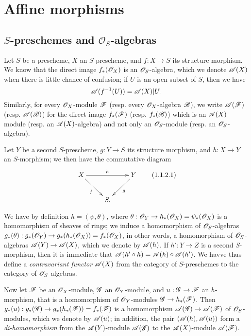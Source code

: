 \section{Affine morphisms}
\label{section:2.1}

\subsection{$S$-preschemes and $\mathcal{O}_S$-algebras}
\label{subsection:2.1.1}

\begin{env}[1.1.1]
\label{2.1.1.1}
Let $S$ be a prescheme, $X$ an $S$-prescheme, and $f:X\to S$ its structure morphism.
We know  that the direct image $f_*(\mathscr{O}_X)$ is an $\mathscr{O}_S$-algebra, which we
denote $\mathscr{A}(X)$ when there is little chance of confusion; if $U$ is an open subset of $S$, then we have
\[
  \mathscr{A}(f^{-1}(U))=\mathscr{A}(X)|U.
\]
Similarly, for every $\mathscr{O}_X$-module $\mathscr{F}$ (resp. every $\mathscr{O}_X$-algebra $\mathscr{B}$), we write $\mathscr{A}(\mathscr{F})$ (resp. $\mathscr{A}(\mathscr{B})$) for the direct image $f_*(\mathscr{F})$ (resp. $f_*(\mathscr{B})$) which is an $\mathscr{A}(X)$-module (resp. an $\mathscr{A}(X)$-algebra) and not only an $\mathscr{O}_S$-module (resp. an $\mathscr{O}_S$-algebra).
\end{env}

\begin{env}[1.1.2]
\label{2.1.1.2}
Let $Y$ be a second $S$-prescheme, $g:Y\to S$ its structure morphism, and $h:X\to Y$ an $S$-morphism; we then have the commutative diagram
\[
\label{eq:2.1.1.2.1}
  \xymatrix{
    X\ar[rr]^h\ar[rd]_f & &
    Y\ar[ld]^g\\
    & S.
  }
  \tag{1.1.2.1}
\]

We have by definition $h=(\psi,\theta)$, where $\theta:\sh{O}_Y\to h_*(\sh{O}_X)=\psi_*(\sh{O}_X)$ is a homomorphism of sheaves of rings; we induce  a homomorphism of $\mathscr{O}_S$-algebras $g_*(\theta):g_*(\sh{O}_Y)\to g_*(h_*(\sh{O}_X))=f_*(\sh{O}_X)$, in other words, a homomorphism of $\mathscr{O}_S$-algebras $\sh{A}(Y)\to\sh{A}(X)$, which we denote by $\mathscr{A}(h)$.
If $h':Y\to Z$ is a second $S$-morphism, then it is immediate that $\mathscr{A}(h'\circ h)=\mathscr{A}(h)\circ\mathscr{A}(h')$.
We havve thus define a \emph{contravariant functor $\mathscr{A}(X)$} from the category of $S$-preschemes to the category of $\mathscr{O}_S$-algebras.

Now let $\mathscr{F}$ be an $\mathscr{O}_X$-module, $\mathscr{G}$ an $\mathscr{O}_Y$-module, and $u:\sh{G}\to\sh{F}$ an $h$-morphism, that is  a homomorphism of $\mathscr{O}_Y$-modules $\sh{G}\to h_*(\sh{F})$.
Then $g_*(u):g_*(\sh{G})\to g_*(h_*(\sh{F}))=f_*(\sh{F})$ is a homomorphism $\sh{A}(\sh{G})\to\sh{A}(\sh{F})$ of $\mathscr{O}_S$-modules, which we denote by $\mathscr{A}(u)$; in addition, the pair $(\mathscr{A}(h),\mathscr{A}(u))$ form a \emph{di-homomorphism} from the $\mathscr{A}(Y)$-module $\mathscr{A}(\mathscr{G})$ to the $\mathscr{A}(X)$-module $\mathscr{A}(\mathscr{F})$.
\end{env}

